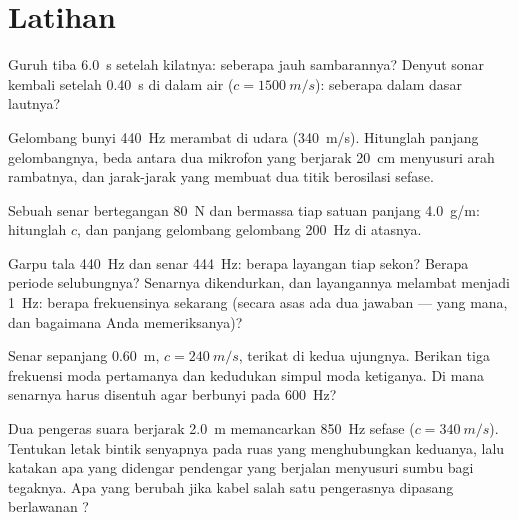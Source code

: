 \section{Latihan}

\begin{exercise}[$\star$]\label{exo:b1:wave-propagation:1}
Guruh tiba \qty{6.0}{s} setelah kilatnya: seberapa jauh sambarannya?
Denyut sonar kembali setelah \qty{0.40}{s} di dalam air
($c = \qty{1500}{m/s}$): seberapa dalam dasar lautnya?
\end{exercise}

\begin{exercise}[$\star$]\label{exo:b1:wave-propagation:2}
Gelombang bunyi \qty{440}{Hz} merambat di udara (\qty{340}{m/s}).
Hitunglah panjang gelombangnya, beda  antara dua mikrofon yang
berjarak \qty{20}{cm} menyusuri arah rambatnya, dan jarak-jarak yang
membuat dua titik berosilasi sefase.
\end{exercise}

\begin{exercise}[$\star$]\label{exo:b1:wave-propagation:3}
Sebuah senar bertegangan \qty{80}{N} dan bermassa tiap satuan panjang
\qty{4.0}{g/m}: hitunglah $c$, dan panjang gelombang gelombang
\qty{200}{Hz} di atasnya.
\end{exercise}

\begin{exercise}[$\star$]\label{exo:b1:wave-propagation:4}
Garpu tala \qty{440}{Hz} dan senar \qty{444}{Hz}: berapa layangan tiap
sekon? Berapa periode selubungnya? Senarnya dikendurkan, dan layangannya
melambat menjadi \qty{1}{Hz}: berapa frekuensinya sekarang (secara asas
ada dua jawaban --- yang mana, dan bagaimana Anda memeriksanya)?
\end{exercise}

\begin{exercise}[$\star\star$]\label{exo:b1:wave-propagation:5}
Senar sepanjang \qty{0.60}{m}, $c = \qty{240}{m/s}$, terikat di kedua
ujungnya. Berikan tiga frekuensi moda pertamanya dan kedudukan simpul
moda ketiganya. Di mana senarnya harus disentuh agar berbunyi pada
\qty{600}{Hz}?
\end{exercise}

\begin{exercise}[$\star\star$]\label{exo:b1:wave-propagation:6}
Dua pengeras suara berjarak \qty{2.0}{m} memancarkan \qty{850}{Hz}
sefase ($c = \qty{340}{m/s}$). Tentukan letak bintik senyapnya pada ruas
yang menghubungkan keduanya, lalu katakan apa yang didengar pendengar
yang berjalan menyusuri sumbu bagi tegaknya. Apa yang berubah jika kabel
salah satu pengerasnya dipasang berlawanan ?
\end{exercise}

